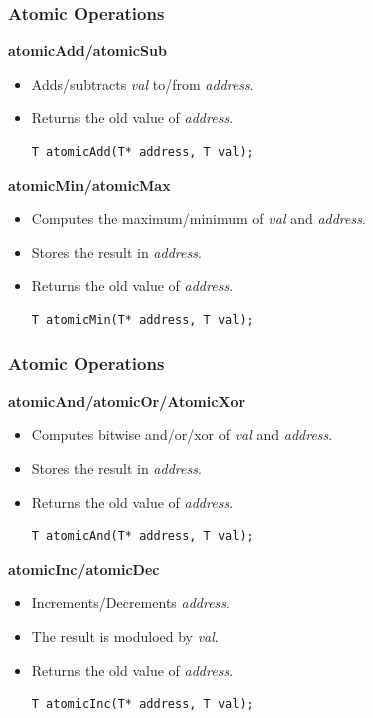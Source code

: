 \documentclass[aspectratio=169,handout]{beamer}
\begin{document}
\begin{frame}[fragile]
\frametitle{Atomic Operations}

\textbf{atomicAdd/atomicSub}
\begin{itemize}
	\item Adds/subtracts \textit{val} to/from \textit{address}.
	\item Returns the old value of \textit{address}.
\begin{lstlisting}
T atomicAdd(T* address, T val);
\end{lstlisting}
\end{itemize}

\textbf{atomicMin/atomicMax}
\begin{itemize}
		\item Computes the maximum/minimum of \textit{val} and \textit{address}.
		\item Stores the result in \textit{address}.
		\item Returns the old value of \textit{address}.
\begin{lstlisting}
T atomicMin(T* address, T val);
\end{lstlisting}
\end{itemize}


\end{frame}

\begin{frame}[fragile]
\frametitle{Atomic Operations}

\textbf{atomicAnd/atomicOr/AtomicXor}
\begin{itemize}
	\item Computes bitwise and/or/xor of \textit{val} and \textit{address}.
	\item Stores the result in \textit{address}.
	\item Returns the old value of \textit{address}.
\begin{lstlisting}
T atomicAnd(T* address, T val);
\end{lstlisting}
\end{itemize}

\textbf{atomicInc/atomicDec}
\begin{itemize}
	\item Increments/Decrements \textit{address}.
	\item The result is moduloed by \textit{val}.
	\item Returns the old value of \textit{address}.
\begin{lstlisting}
T atomicInc(T* address, T val);
\end{lstlisting}
\end{itemize}
\end{frame}
\end{document}
